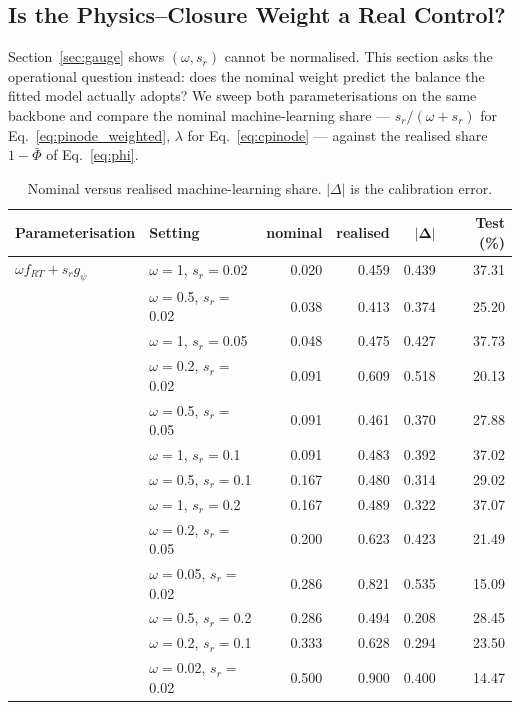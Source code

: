 \subsection{Is the Physics--Closure Weight a Real Control?}
\label{sec:results_weights}

Section~\ref{sec:gauge} shows $(\omega,s_r)$ cannot be normalised. This section
asks the operational question instead: does the nominal weight predict the
balance the fitted model actually adopts? We sweep both parameterisations on the
same backbone and compare the nominal machine-learning share ---
$s_r/(\omega+s_r)$ for Eq.~\eqref{eq:pinode_weighted}, $\lambda$ for
Eq.~\eqref{eq:cpinode} --- against the realised share $1-\bar\Phi$ of
Eq.~\eqref{eq:phi}.

\begin{table}[H]
\caption{Nominal versus realised machine-learning share. $|\Delta|$ is the
calibration error.}
\label{tab:weights}
\centering\scriptsize
\setlength{\tabcolsep}{4pt}
%
\begin{tabular}{llrrrr}
\hline
\textbf{Parameterisation} & \textbf{Setting} & \textbf{nominal} & \textbf{realised} & $\bm{|\Delta|}$ & \textbf{Test (\%)} \\
\hline
$\omega f_{RT}+s_r g_\psi$ & $\omega{=}$1, $s_r{=}$0.02 & 0.020 & 0.459 & 0.439 & 37.31 \\
 & $\omega{=}$0.5, $s_r{=}$0.02 & 0.038 & 0.413 & 0.374 & 25.20 \\
 & $\omega{=}$1, $s_r{=}$0.05 & 0.048 & 0.475 & 0.427 & 37.73 \\
 & $\omega{=}$0.2, $s_r{=}$0.02 & 0.091 & 0.609 & 0.518 & 20.13 \\
 & $\omega{=}$0.5, $s_r{=}$0.05 & 0.091 & 0.461 & 0.370 & 27.88 \\
 & $\omega{=}$1, $s_r{=}$0.1 & 0.091 & 0.483 & 0.392 & 37.02 \\
 & $\omega{=}$0.5, $s_r{=}$0.1 & 0.167 & 0.480 & 0.314 & 29.02 \\
 & $\omega{=}$1, $s_r{=}$0.2 & 0.167 & 0.489 & 0.322 & 37.07 \\
 & $\omega{=}$0.2, $s_r{=}$0.05 & 0.200 & 0.623 & 0.423 & 21.49 \\
 & $\omega{=}$0.05, $s_r{=}$0.02 & 0.286 & 0.821 & 0.535 & 15.09 \\
 & $\omega{=}$0.5, $s_r{=}$0.2 & 0.286 & 0.494 & 0.208 & 28.45 \\
 & $\omega{=}$0.2, $s_r{=}$0.1 & 0.333 & 0.628 & 0.294 & 23.50 \\
 & $\omega{=}$0.02, $s_r{=}$0.02 & 0.500 & 0.900 & 0.400 & 14.47 \\

\end{tabular}
\end{table}

